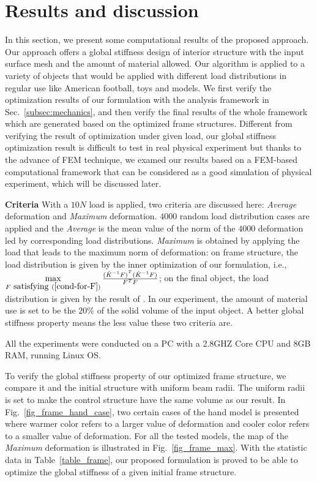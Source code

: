 
\section{Results and discussion}
\label{sec:result}

In this section, we present some computational results of the proposed approach. Our approach offers a global stiffness design of interior structure with the input surface mesh and the amount of material allowed. Our algorithm is applied to a variety of objects that would be applied with different load distributions in regular use like American football, toys and models. We first verify the optimization results of our formulation with the analysis framework in Sec.~\ref{subsec:mechanics}, and then verify the final results of the whole framework which are generated based on the optimized frame structures. Different from verifying the result of optimization under given load, our global stiffness optimization result is difficult to test in real physical experiment but thanks to the advance of FEM technique, we examed our results based on a FEM-based computational framework that can be considered as a good simulation of physical experiment, which will be discussed later. 

\noindent\textbf{Criteria} With a $10N$ load is applied, two criteria are discussed here: \textit{Average} deformation and \textit{Maximum} deformation. $4000$ random load distribution cases are applied and the \textit{Average} is the mean value of the norm of the $4000$ deformation led by corresponding load distributions. \textit{Maximum} is obtained by applying the load that leads to the maximum norm of deformation: on frame structure, the load distribution is given by the inner optimization of our formulation, i.e., $\max\limits_{F \mbox{ satisfying }  (\ref{cond-for-F}) } \frac{{(\hat{K}^{-1}F)}^T(\hat{K}^{-1}F)}{{F}^TF}$; on the final object, the load distribution is given by the result of \cite{zhou:2013}. In our experiment, the amount of material use is set to be the $20\%$ of the solid volume of the input object. A better global stiffness property means the less value these two criteria are. 

All the experiments were conducted on a PC with a 2.8GHZ Core CPU and 8GB RAM, running Linux OS.

To verify the global stiffness property of our optimized frame structure, we compare it and the initial structure with uniform beam radii. The uniform radii is set to make the control structure have the same volume as our result. In Fig.~\ref{fig_frame_hand_case}, two certain cases of the hand model is presented where warmer color refers to a larger value of deformation and cooler color refers to a smaller value of deformation. For all the tested models, the map of the \textit{Maximum} deformation is illustrated in Fig.~\ref{fig_frame_max}. With the statistic data in Table~\ref{table_frame}, our proposed formulation is proved to be able to optimize the global stiffness of a given initial frame structure.


